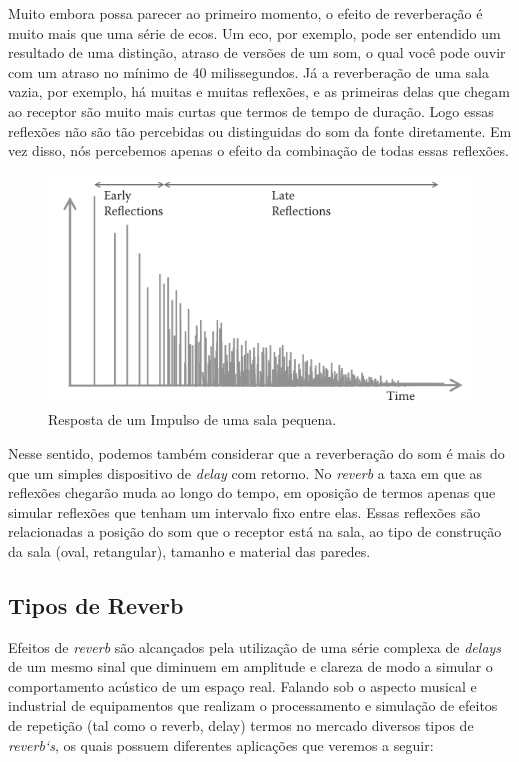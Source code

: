 		Muito embora possa parecer ao primeiro momento, o efeito de reverberação é muito mais que uma série de ecos. Um eco, por exemplo, pode ser entendido um resultado de uma distinção, atraso de versões de um som, o qual você pode ouvir com um atraso no mínimo de 40 milissegundos. Já a reverberação de uma sala vazia, por exemplo, há muitas e muitas reflexões, e as primeiras delas que chegam ao receptor são muito mais curtas que termos de tempo de duração. Logo essas reflexões não são tão percebidas ou distinguidas do som da fonte diretamente. Em vez disso, nós percebemos apenas o efeito da combinação de todas essas reflexões.
		
		\begin{figure}[!ht]
			\centering
			\includegraphics[scale=0.5]{./figuras/reverb02.png}
			\caption{Resposta de um Impulso de uma sala pequena.}
			\label{reverb02}
		\end{figure}
		
		Nesse sentido, podemos também considerar que a reverberação do som é mais do que um simples dispositivo de \textit{delay} com retorno. No \textit{reverb} a taxa em que as reflexões chegarão muda ao longo do tempo, em oposição de termos apenas que simular reflexões que tenham um intervalo fixo entre elas. Essas reflexões são relacionadas a posição do som que o receptor está na sala, ao tipo de construção da sala (oval, retangular), tamanho e material das paredes. 
		
		
	\subsection{Tipos de Reverb}
	
		Efeitos de \textit{reverb} são alcançados pela utilização de uma série complexa de \textit{delays} de um mesmo sinal que diminuem em amplitude e clareza de modo a simular o comportamento acústico de um espaço real. Falando sob o aspecto musical e industrial de equipamentos que realizam o processamento e simulação de efeitos de repetição (tal como o reverb, delay) termos no mercado diversos tipos de \textit{reverb`s}, os quais possuem diferentes aplicações que veremos a seguir:
		

